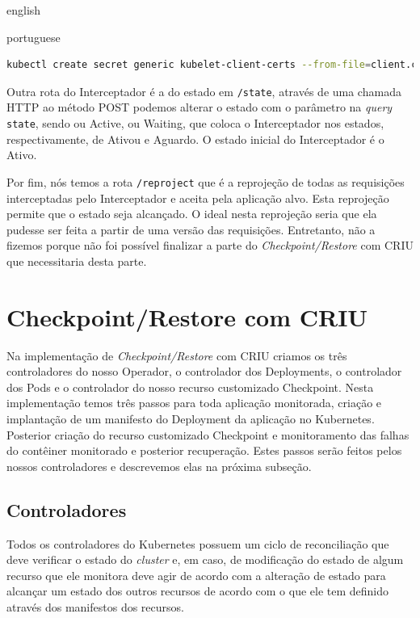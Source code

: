 \begin{otherlanguage*}{english}
\begin{otherlanguage*}{portuguese}
\begin{lstlisting}[language=bash,caption={Criação do Secret para comunicação com o kubelet para compartilhamento com nosso Interceptador.},label={listing:kubelet-secret}]
kubectl create secret generic kubelet-client-certs --from-file=client.crt=/etc/kubernetes/pki/apiserver-kubelet-client.crt --from-file=client.key=/etc/kubernetes/pki/apiserver-kubelet-client.key
\end{lstlisting}

Outra rota do Interceptador é a do estado em \texttt{/state}, através de uma chamada
HTTP ao método POST podemos alterar o estado com o parâmetro na \textit{query}
\texttt{state}, sendo ou Active, ou Waiting, que coloca o Interceptador nos estados,
respectivamente, de Ativou e Aguardo. O estado inicial do Interceptador é o Ativo.

Por fim, nós temos a rota \texttt{/reproject} que é a reprojeção de todas as requisições
interceptadas pelo Interceptador e aceita pela aplicação alvo. Esta reprojeção permite
que o estado seja alcançado. O ideal nesta reprojeção seria que ela pudesse ser feita a
partir de uma versão das requisições. Entretanto, não a fizemos porque não foi possível
finalizar a parte do \textit{Checkpoint/Restore} com CRIU que necessitaria desta parte.

\section{Checkpoint/Restore com CRIU}

Na implementação de \textit{Checkpoint/Restore} com CRIU criamos os três controladores do
nosso Operador, o controlador dos Deployments, o controlador dos Pods e o controlador do
nosso recurso customizado Checkpoint. Nesta implementação temos três passos para toda
aplicação monitorada, criação e implantação de um manifesto do Deployment da aplicação
no Kubernetes. Posterior criação do recurso customizado Checkpoint e monitoramento das
falhas do contêiner monitorado e posterior recuperação. Estes passos serão feitos pelos 
nossos controladores e descrevemos elas na próxima subseção.

\subsection{Controladores}

Todos os controladores do Kubernetes possuem um ciclo de reconciliação que deve
verificar o estado do \textit{cluster} e, em caso, de modificação do estado de algum
recurso que ele monitora deve agir de acordo com a alteração de estado para alcançar
um estado dos outros recursos de acordo com o que ele tem definido através dos manifestos
dos recursos.


\end{otherlanguage*}
\end{otherlanguage*}
